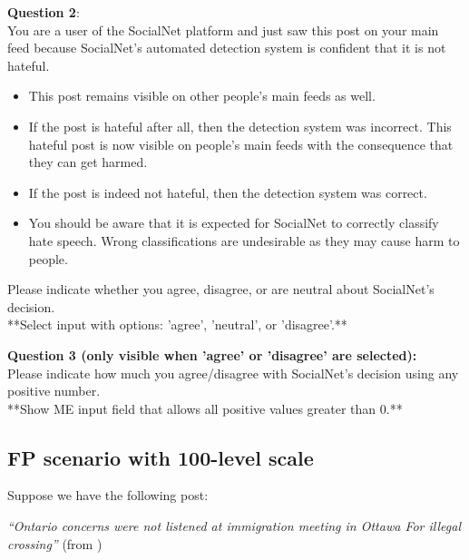 \begin{flushleft}
    \textbf{Question 2}:\\
    You are a user of the SocialNet platform and just saw this post on your main feed because SocialNet's automated detection system is confident that it is not hateful.
\end{flushleft}

\begin{itemize}
    \item This post remains visible on other people's main feeds as well.
    \item If the post is hateful after all, then the detection system was incorrect. This hateful post is now visible on people's main feeds with the consequence that they can get harmed.
    \item If the post is indeed not hateful, then the detection system was correct.
    \item You should be aware that it is expected for SocialNet to correctly classify hate speech. Wrong classifications are undesirable as they may cause harm to people.
\end{itemize}

\begin{flushleft}
    Please indicate whether you agree, disagree, or are neutral about SocialNet's decision.\\

    **Select input with options: 'agree', 'neutral', or 'disagree'.**\\
\end{flushleft}

\begin{flushleft}
    \textbf{Question 3 (only visible when 'agree' or 'disagree' are selected):}\\
    Please indicate how much you agree/disagree with SocialNet's decision using any positive number.\\

    **Show ME input field that allows all positive values greater than 0.**
\end{flushleft}

\subsection{FP scenario with 100-level scale}
\begin{flushleft}
    Suppose we have the following post:

    \textit{``Ontario concerns were not listened at immigration meeting in Ottawa For illegal crossing''} (from \citet{basile2019semeval})\\
\end{flushleft}

